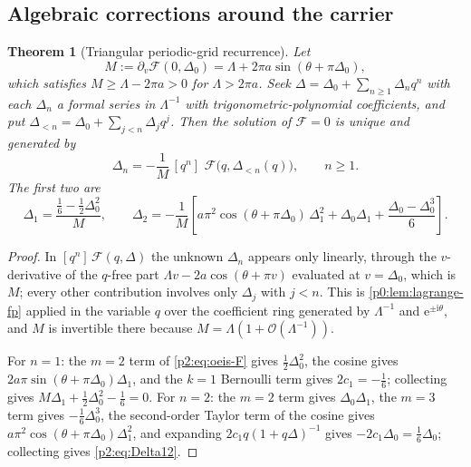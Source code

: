 \documentclass[11pt,a4paper,oneside]{book}
\theoremstyle{plain}
\newtheorem{theorem}{Theorem}[chapter]
\theoremstyle{definition}
\theoremstyle{remark}
\newcommand{\e}{\mathrm{e}}
\newcommand{\ii}{\mathrm{i}}
\newcommand{\Coef}[1]{[#1]\,}
\newcommand{\bigO}{\mathcal{O}}
\begin{document}
\subsection{Algebraic corrections around the carrier}

\begin{theorem}[Triangular periodic-grid recurrence]
\label{p2:thm:periodic-recurrence}
Let
\begin{equation}
 M:=\partial_v\mathcal F(0,\Delta_0)=\Lambda+2\pi a\sin(\theta+\pi\Delta_0),
 \label{p2:eq:M}
\end{equation}
which satisfies \(M\ge\Lambda-2\pi a>0\) for \(\Lambda>2\pi a\).  Seek
\(\Delta=\Delta_0+\sum_{n\ge1}\Delta_nq^n\) with each \(\Delta_n\) a formal
series in \(\Lambda^{-1}\) with trigonometric-polynomial coefficients, and put
\(\Delta_{<n}=\Delta_0+\sum_{j<n}\Delta_jq^j\).  Then the solution of
\(\mathcal F=0\) is unique and generated by
\begin{equation}
 \boxed{\;
 \Delta_n=-\frac1M\,\Coef{q^n}\,
 \mathcal F\bigl(q,\Delta_{<n}(q)\bigr),\qquad n\ge1. \;}
 \label{p2:eq:periodic-recurrence}
\end{equation}
The first two are
\begin{equation}
 \Delta_1=\frac{\tfrac16-\tfrac12\Delta_0^2}{M},
 \qquad
 \Delta_2=-\frac1M\left[
 a\pi^2\cos(\theta+\pi\Delta_0)\,\Delta_1^2
 +\Delta_0\Delta_1+\frac{\Delta_0-\Delta_0^3}{6}\right].
 \label{p2:eq:Delta12}
\end{equation}
\end{theorem}

\begin{proof}
In \(\Coef{q^n}\mathcal F(q,\Delta)\) the unknown \(\Delta_n\) appears only
linearly, through the \(v\)-derivative of the \(q\)-free part
\(\Lambda v-2a\cos(\theta+\pi v)\) evaluated at \(v=\Delta_0\), which is
\(M\); every other contribution involves only \(\Delta_j\) with \(j<n\).
This is \cref{p0:lem:lagrange-fp} applied in the variable \(q\) over the
coefficient ring generated by \(\Lambda^{-1}\) and \(\e^{\pm\ii\theta}\), and
\(M\) is invertible there because \(M=\Lambda(1+\bigO(\Lambda^{-1}))\).

For \(n=1\): the \(m=2\) term of \cref{p2:eq:oeis-F} gives
\(\tfrac12\Delta_0^2\), the cosine gives \(2a\pi\sin(\theta+\pi\Delta_0)
\Delta_1\), and the \(k=1\) Bernoulli term gives \(2c_1=-\tfrac16\); collecting
gives \(M\Delta_1+\tfrac12\Delta_0^2-\tfrac16=0\).  For \(n=2\): the \(m=2\)
term gives \(\Delta_0\Delta_1\), the \(m=3\) term gives
\(-\tfrac16\Delta_0^3\), the second-order Taylor term of the cosine gives
\(a\pi^2\cos(\theta+\pi\Delta_0)\Delta_1^2\), and expanding
\(2c_1q(1+q\Delta)^{-1}\) gives \(-2c_1\Delta_0=\tfrac16\Delta_0\); collecting
gives \cref{p2:eq:Delta12}.
\end{proof}
\end{document}
